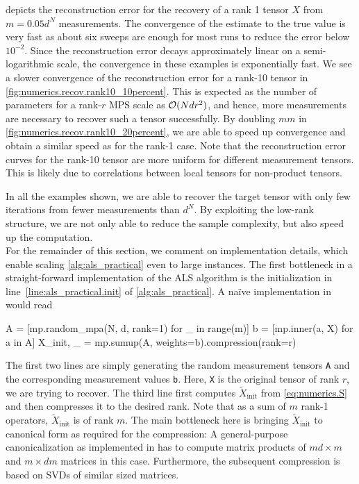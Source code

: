  depicts the reconstruction error for the recovery of a rank 1 tensor $X$ from $m = 0.05 d^N$ measurements.
The convergence of the estimate to the true value is very fast as about six sweeps are enough for most runs to reduce the error below $10^{-2}$.
Since the reconstruction error decays approximately linear on a semi-logarithmic scale, the convergence in these examples is exponentially fast.
We see a slower convergence of the reconstruction error for a rank-10 tensor in \cref{fig:numerics.recov.rank10_10percent}.
This is expected as the number of parameters for a rank-$r$ MPS scale as ${\mathcal{O}}(N d r^2)$, and hence, more measurements are necessary to recover such a tensor successfully.
By doubling $mm$ in \cref{fig:numerics.recov.rank10_20percent}, we are able to speed up convergence and obtain a similar speed as for the rank-1 case.
Note that the reconstruction error curves for the rank-10 tensor are more uniform for different measurement tensors.
This is likely due to correlations between local tensors for non-product tensors.

In all the examples shown, we are able to recover the target tensor with only few iterations from fewer measurements than $d^N$.
By exploiting the low-rank structure, we are not only able to reduce the sample complexity, but also speed up the computation.\\



For the remainder of this section, we comment on implementation details, which enable scaling \cref{alg:als_practical} even to large instances.
The first bottleneck in a straight-forward implementation of the ALS algorithm is the initialization in line~\ref{line:als_practical.init} of \cref{alg:als_practical}.
A na\"ive implementation in \mpnum{} would read
\begin{pythoncode}
  A = [mp.random_mpa(N, d, rank=1) for _ in range(m)]
  b = [mp.inner(a, X) for a in A]
  X_init, _ = mp.sumup(A, weights=b).compression(rank=r)
\end{pythoncode}
The first two lines are simply generating the random measurement tensors \texttt{A} and the corresponding measurement values \texttt{b}.
Here, \texttt{X} is the original tensor of rank $r$, we are trying to recover.
The third line first computes $\tilde X_\mathrm{init}$ from \cref{eq:numerics.S} and then compresses it to the desired rank.
Note that as a sum of $m$ rank-1 operators, $\tilde X_\mathrm{init}$ is of rank $m$.
The main bottleneck here is bringing $\tilde X_\mathrm{init}$ to canonical form as required for the compression:
A general-purpose canonicalization as implemented in \mpnum{} has to compute matrix products of $m d \times m$ and $m \times d m$ matrices in this case.
Furthermore, the subsequent compression is based on SVDs of similar sized matrices.

